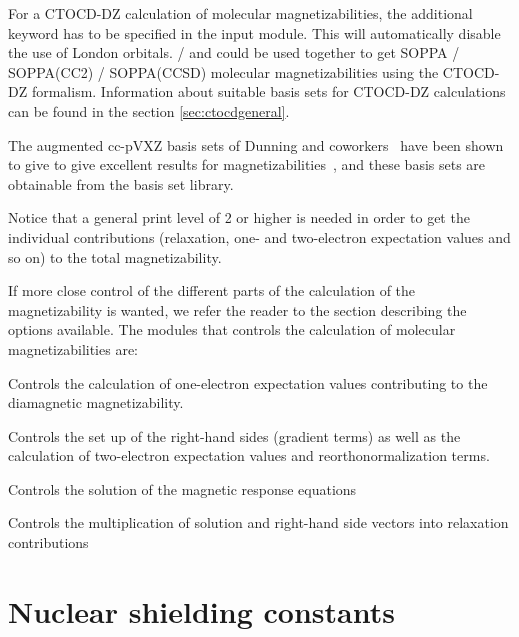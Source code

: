 For a CTOCD-DZ calculation of molecular
magnetizabilities, the additional keyword  has to be
specified in the  input module. This will
automatically disable the use of London orbitals.  /
 and  could be used together to get SOPPA /
SOPPA(CC2) / SOPPA(CCSD) molecular magnetizabilities using the CTOCD-DZ
formalism. Information about suitable basis sets for CTOCD-DZ
calculations can be found in the section \ref{sec:ctocdgeneral}.

The augmented cc-pVXZ basis sets of Dunning and
coworkers~\cite{thdjcp90,rakthdrjhjcp96,dewthdjcp98,dewthdjcp100} have
been shown to give  to give excellent results for
magnetizabilities~\cite{krthklbpjhjajjcp99,krthpjklbcpl223,krhsthklbpjjacs116},
and these basis sets are obtainable from the basis set library.

Notice that a general print level of 2 or higher is needed in order to
get the individual contributions (relaxation, one- and
two-electron expectation values and so on) to the total magnetizability.

If more close control of the different parts of the calculation of the
magnetizability is wanted, we refer the reader to the section
describing the options available. The modules that controls the
calculation of molecular magnetizabilities are:

\begin{list}{}{\itemsep 0.10cm \parsep 0.0cm}
\item[\Sec{EXPECT}] Controls the calculation of one-electron
expectation values contributing to the diamagnetic magnetizability.
\item[\Sec{GETSGY}] Controls the set up of the right-hand sides
(gradient terms) as well as the calculation of two-electron
expectation values and reorthonormalization terms.
\item[\Sec{LINRES}] Controls the solution of the magnetic response
equations
\item[\Sec{RELAX}] Controls the multiplication of solution and right-hand
side vectors into relaxation contributions
\end{list}

\section{Nuclear shielding constants}\label{sec:shieldings}

